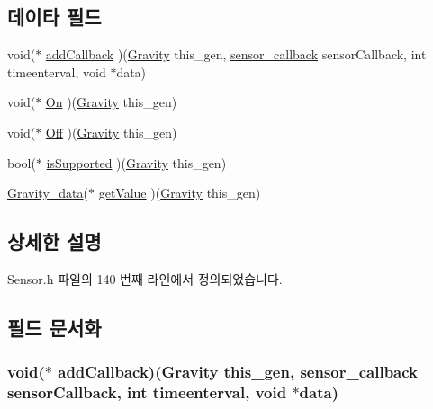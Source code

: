 \subsection*{데이타 필드}
\begin{DoxyCompactItemize}
\item 
void($\ast$ \hyperlink{struct___gravity_a5a8f94ec0d47531eddbb77969a91b790}{add\-Callback} )(\hyperlink{_sensor_8h_a4ceb392904d2aa4af24c1934cb8acb43}{Gravity} this\-\_\-gen, \hyperlink{_sensor_8h_ad8114207845fc5e0aa30832f0c718cd6}{sensor\-\_\-callback} sensor\-Callback, int timeenterval, void $\ast$data)
\item 
void($\ast$ \hyperlink{struct___gravity_a84c1b656c2161ac6e65f9d65ef3a71d6}{On} )(\hyperlink{_sensor_8h_a4ceb392904d2aa4af24c1934cb8acb43}{Gravity} this\-\_\-gen)
\item 
void($\ast$ \hyperlink{struct___gravity_a00ad5bd0e2b545812fceaaed88c0c48b}{Off} )(\hyperlink{_sensor_8h_a4ceb392904d2aa4af24c1934cb8acb43}{Gravity} this\-\_\-gen)
\item 
bool($\ast$ \hyperlink{struct___gravity_a64d7cabe8a37fd627a0fa93af3372ec6}{is\-Supported} )(\hyperlink{_sensor_8h_a4ceb392904d2aa4af24c1934cb8acb43}{Gravity} this\-\_\-gen)
\item 
\hyperlink{_sensor_8h_a6e9c581566bfca9e8c63cb6e4a703062}{Gravity\-\_\-data}($\ast$ \hyperlink{struct___gravity_afe837cce5c4d493eb3b48a65261d000d}{get\-Value} )(\hyperlink{_sensor_8h_a4ceb392904d2aa4af24c1934cb8acb43}{Gravity} this\-\_\-gen)
\end{DoxyCompactItemize}


\subsection{상세한 설명}


Sensor.\-h 파일의 140 번째 라인에서 정의되었습니다.



\subsection{필드 문서화}
\hypertarget{struct___gravity_a5a8f94ec0d47531eddbb77969a91b790}{
\subsubsection[{add\-Callback}]{\setlength{\rightskip}{0pt plus 5cm}void($\ast$  add\-Callback)({\bf Gravity} this\-\_\-gen, {\bf sensor\-\_\-callback} sensor\-Callback, int timeenterval, void $\ast$data)}}\label{struct___gravity_a5a8f94ec0d47531eddbb77969a91b790}


